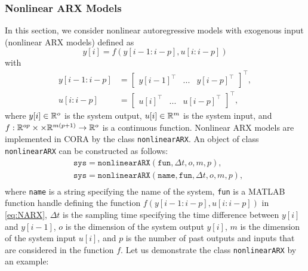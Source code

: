\subsubsection{Nonlinear ARX Models} \label{sec:nonlinearSystems_ARX}

In this section, we consider nonlinear autoregressive models with exogenous input (nonlinear ARX models) defined as
\begin{equation}\label{eq:NARX}
	y[i] = f(y[i-1:i-p],{u}[i:i-p])
\end{equation} 
with
\begin{align*}
	y[i-1:i-p] &=\begin{bmatrix} y[i-1]^\top &... & y[i-p]^\top\end{bmatrix}^\top, \\
	{u}[i:i-p] &= \begin{bmatrix} {u}[i]^\top &...&{u}[i-p]^\top\end{bmatrix}^\top,
\end{align*} 
where $y[i] \in \mathbb{R}^o$ is the system output, $u[i] \in \mathbb{R}^m$ is the system input, and $f:\mathbb{R}^{op} \times \times \mathbb{R}^{m(p+1)} \to \mathbb{R}^o$ is a continuous function. %
Nonlinear ARX models are implemented in CORA by the class \texttt{nonlinearARX}. An object of class \texttt{nonlinearARX} can be constructed as follows:
\begin{equation*}
	\begin{split}
    	& \texttt{sys} = \texttt{nonlinearARX}(\texttt{fun},\Delta t,o,m,p), \\
     	& \texttt{sys} = \texttt{nonlinearARX}(\texttt{name},\texttt{fun},\Delta t,o,m,p), \\
	\end{split}
\end{equation*} 
where \texttt{name} is a string specifying the name of the system, \texttt{fun} is a MATLAB function handle defining the function $f(y[i-1:i-p],{u}[i:i-p])$ in \eqref{eq:NARX}, $\Delta t$ is the sampling time specifying the time difference between $y[i]$ and $y[i-1]$, $o$ is the dimension of the system output $y[i]$, $m$ is the dimension of the system input $u[i]$, and $p$ is the number of past outputs and inputs that are considered in the function $f$. Let us demonstrate the class \texttt{nonlinearARX} by an example:

